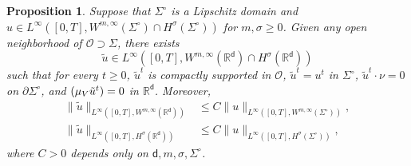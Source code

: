 \documentclass[10pt]{amsart}
\newcommand{\Sigmacirc}{\Sigma^\circ}
\theoremstyle{plain}
\newtheorem{prop}[thm]{Proposition}
\theoremstyle{definition}
\let\div\relax
\DeclareMathOperator{\div}{\mathrm{div}}
\newcommand{\R}{{\mathbb{R}}}
\let\p\partial
\let\tl\tilde
\renewcommand{\d}{\mathsf{d}}
\begin{document}
\skpt\begin{prop}\label{lem:VFext}
Suppose that $\Sigmacirc$ is a Lipschitz domain and
$
u \in L^\infty([0,T], W^{m,\infty}(\Sigmacirc)\cap H^\sigma(\Sigmacirc))
$
for $m,\sigma\ge 0$. Given any open neighborhood of $\mathcal{O}\supset \Sigma$, there exists\vspace*{-5pt}
\[
\tl{u}\in L^\infty([0,T], W^{m,\infty}(\R^\d) \cap H^\sigma(\R^\d))
\]
such that for every $t\ge 0$, $\tl{u}^t$ is compactly supported in $\mathcal{O}$, $\tl{u}^t = u^t$ in $\Sigmacirc$, $\tl{u}^t\cdot \nu = 0$ on $\p\Sigmacirc$, and $\div(\mu_V\tl{u}^t) = 0$ in $\R^\d$. Moreover,\vspace*{-5pt}
\begin{align*}
\|\tl{u}\|_{L^\infty([0,T], W^{m,\infty}(\R^\d))} &\le C \|u\|_{L^\infty([0,T], W^{m,\infty}(\Sigmacirc))}, \\
\|\tl{u}\|_{L^\infty([0,T], H^\sigma(\R^\d))} &\le C \|u\|_{L^\infty([0,T], H^\sigma(\Sigmacirc))},
\end{align*}
where $C>0$ depends only on $\d,m,\sigma,\Sigmacirc$.
\end{prop}
\end{document}
